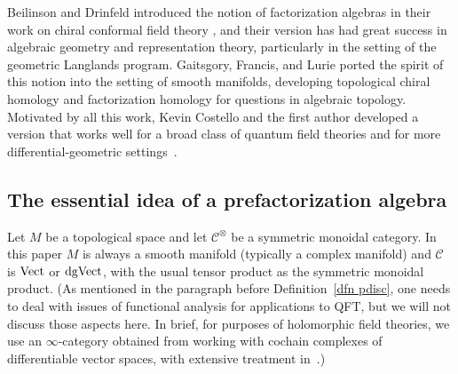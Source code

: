 \documentclass[11pt]{amsart}
\def\mc{\mathcal}
\begin{document}
\begin{rmk}
Beilinson and Drinfeld introduced the notion of factorization algebras in their work on chiral conformal field theory \cite{BD},
and their version has had great success in algebraic geometry and representation theory,
particularly in the setting of the geometric Langlands program.
Gaitsgory, Francis, and Lurie ported the spirit of this notion into the setting of smooth manifolds,
developing topological chiral homology \cite{LurieHA} and factorization homology \cite{AF}
for questions in algebraic topology.
Motivated by all this work, Kevin Costello and the first author developed a version that works well for a broad class of quantum field theories and for more differential-geometric settings~\cite{CG1,CG2}.
\end{rmk}

\subsection{The essential idea of a prefactorization algebra}

Let $M$ be a topological space and let $\mc{C}^\otimes$ be a symmetric monoidal category. 
In this paper $M$ is always a smooth manifold (typically a complex manifold) and $\mc{C}$ is ${\rm Vect}$ or ${\rm dgVect}$, with the usual tensor product as the symmetric monoidal product.
(As mentioned in the paragraph before Definition~\ref{dfn pdisc}, one needs to deal with issues of functional analysis for applications to QFT, but we will not discuss those aspects here.
In brief, for purposes of holomorphic field theories, we use an $\infty$-category obtained from working with cochain complexes of differentiable vector spaces, with extensive treatment in~\cite{CG1}.)
\end{document}
